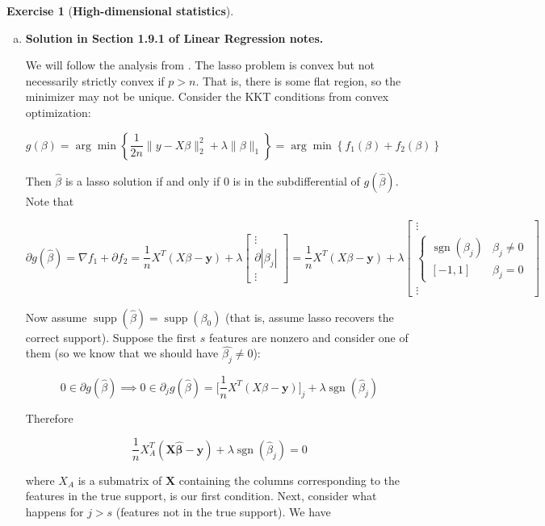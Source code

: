 \documentclass{article}
\theoremstyle{definition}
\newtheorem{exercise}{Exercise}
\theoremstyle{definition}
\theoremstyle{definition}
\theoremstyle{definition}
\begin{document}
\begin{exercise}[\textbf{High-dimensional statistics}]
\begin{enumerate}[(a)]
\item \textbf{Solution in Section 1.9.1 of Linear Regression notes.}

We will follow the analysis from  \citet{Zhao2006}. The lasso problem is convex but not necessarily strictly convex if \(p > n\). That is, there is some flat region, so the minimizer may not be unique. Consider the KKT conditions from convex optimization:

\[
g(\beta) = \arg \min \left\{ \frac{1}{2n} \lVert y - X \beta \rVert_2^2 + \lambda \lVert \beta \rVert_1 \right\} =  \arg \min \left\{ f_1(\beta) + f_2(\beta) \right\}
\]

Then \(\hat{\beta}\) is a lasso solution if and only if 0 is in the subdifferential of \(g(\hat{\beta})\). Note that 

\[
\partial g(\hat{\beta}) = \nabla f_1 + \partial f_2 = \frac{1}{n} X^T(X \beta - \boldsymbol{y}) + \lambda \begin{bmatrix}  \vdots \\ \partial | \beta_j | \\ \vdots \end{bmatrix} = \frac{1}{n} X^T(X \beta - \boldsymbol{y}) + \lambda \begin{bmatrix}  \vdots \\ \begin{cases}  \operatorname{sgn}(\beta_j) & \beta_j \neq 0 \\ [-1, 1] & \beta_j = 0 \end{cases} \\ \vdots \end{bmatrix}
\]

Now assume \(\operatorname{supp}(\hat{\beta}) = \operatorname{supp}(\beta_0)\) (that is, assume lasso recovers the correct support). Suppose the first \(s\) features are nonzero and consider one of them (so we know that we should have \(\hat{\beta_j} \neq 0\)):

\[
0 \in \partial g(\hat{\beta}) \implies 0 \in \partial_j g(\hat{\beta}) = \bigg[ \frac{1}{n} X^T(X \beta - \boldsymbol{y}) \bigg]_j + \lambda \operatorname{sgn}(\hat{\beta}_j) 
\]

Therefore

\begin{equation}\label{linreg.lasso.first.cond}
\frac{1}{n} X_A^T(\boldsymbol{X} \boldsymbol{\hat{\beta}} - \boldsymbol{y}) + \lambda  \operatorname{sgn}(\hat{\beta}_j) = 0
\end{equation}

where \(X_A\) is a submatrix of \(\boldsymbol{X}\) containing the columns corresponding to the features in the true support, is our first condition. Next, consider what happens for \(j > s\) (features not in the true support). We have


\end{enumerate}
\end{exercise}
\end{document}

